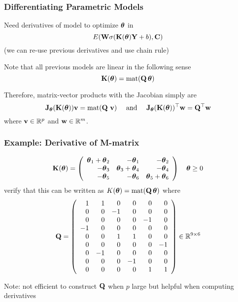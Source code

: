 \documentclass[12pt,fleqn,handout]{beamer}
\begin{document}
\begin{frame}
	\frametitle{Differentiating Parametric Models}
	Need derivatives of model to optimize ${\boldsymbol \theta}$ in
	$$
		E({\bf W} \sigma({\bf K}({\boldsymbol \theta}){\bf Y}+b),{\bf C}) 
	$$
	(we can re-use previous derivatives and use chain rule)
	
	\bigskip
	\pause
	
	Note that all previous models are linear in the following sense
	$$
		{\bf K}({\boldsymbol \theta}) = {\rm mat}({\bf Q}\, {\boldsymbol \theta})
	$$
	
	\bigskip
	\pause
	
	Therefore, matrix-vector products with the Jacobian simply are
	$$
		{\bf J}_{\boldsymbol \theta} ({\bf K}({\boldsymbol \theta})) {\bf v}  = {\rm mat}({\bf Q} \ {\bf v})\quad\text{ and }\quad
		{\bf J}_{\boldsymbol \theta} ({\bf K}({\boldsymbol \theta}))^\top {\bf w}  = {\bf Q}^\top {\bf w}
	$$
	where ${\bf v} \in \mathbb{R}^p$ and ${\bf w} \in \mathbb{R}^m$.
\end{frame}

\begin{frame}\frametitle{Example: Derivative of M-matrix}
	$$
	{\bf K}({\boldsymbol \theta}) = \left(
			\begin{array}{rrr}
				{\boldsymbol \theta}_1+{\boldsymbol \theta}_2 & -{\boldsymbol \theta}_1 & -{\boldsymbol \theta}_2 \\
				-{\boldsymbol \theta}_3 & {\boldsymbol \theta}_3 + {\boldsymbol \theta}_4 & -{\boldsymbol \theta}_4 \\
				-{\boldsymbol \theta}_5 & -{\boldsymbol \theta}_6 & {\boldsymbol \theta}_5+{\boldsymbol \theta}_6
			\end{array}
		\right)
		\quad {\boldsymbol \theta} \geq 0
	$$
	\pause
	verify that this can be written as $K({\boldsymbol \theta}) = {\rm mat}({\bf Q} \, {\boldsymbol \theta})$ where
	$$
		{\bf Q} = \left(
			\begin{array}{rrrrrr}
				1 & 1 & 0 & 0 & 0 & 0 \\
				0 & 0 & -1& 0 & 0 & 0 \\
				0 & 0 & 0 & 0 &-1 & 0 \\
				-1& 0 & 0 & 0 & 0 & 0 \\
				0 & 0 & 1 & 1 & 0 & 0 \\
				0 & 0 & 0 & 0 & 0 &-1 \\
				0 &-1 & 0 & 0 & 0 & 0 \\
				0 & 0 & 0 & -1& 0 & 0 \\
				0 & 0 & 0 & 0 & 1 & 1
			\end{array}
		\right) \in \mathbb{R}^{9\times 6}
	$$
	\begin{center}
		Note: not efficient to construct ${\bf Q}$ when $p$ large but helpful when computing derivatives
	\end{center}
\end{frame}
\end{document}
